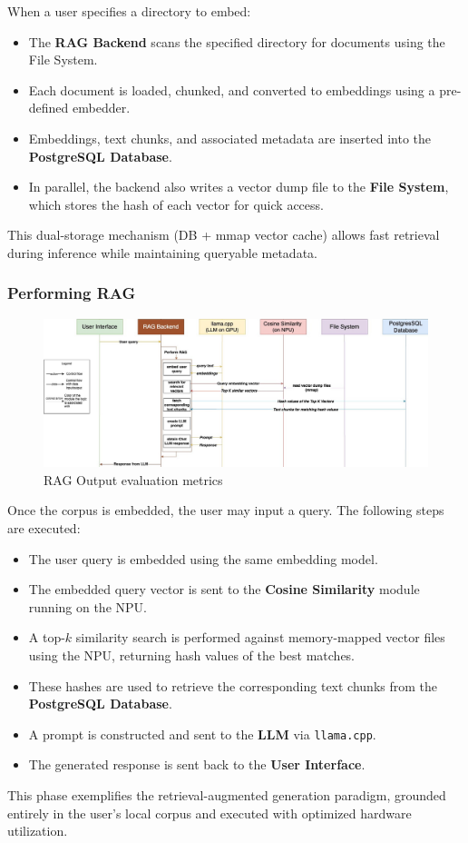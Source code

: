 When a user specifies a directory to embed:

\begin{itemize}
    \item The \textbf{RAG Backend} scans the specified directory for documents using the File System.
    \item Each document is loaded, chunked, and converted to embeddings using a pre-defined embedder.
    \item Embeddings, text chunks, and associated metadata are inserted into the \textbf{PostgreSQL Database}.
    \item In parallel, the backend also writes a vector dump file to the \textbf{File System}, which stores the hash of each vector for quick access.
\end{itemize}

This dual-storage mechanism (DB + mmap vector cache) allows fast retrieval during inference while maintaining queryable metadata.


\subsubsection{Performing RAG}
\label{subsec:AppDesignWorkflow-PerformingRAG}


\begin{figure}[H]
    \centering
    \includegraphics[width=1.0\linewidth]{images/tldr-app-worklfow-pt3.jpg}
    \caption{RAG Output evaluation metrics ~\cite{cardenas2023rag}}
    \label{fig:autoregressive_decoding}
\end{figure}

Once the corpus is embedded, the user may input a query. The following steps are executed:

\begin{itemize}
    \item The user query is embedded using the same embedding model.
    \item The embedded query vector is sent to the \textbf{Cosine Similarity} module running on the NPU.
    \item A top-$k$ similarity search is performed against memory-mapped vector files using the NPU, returning hash values of the best matches.
    \item These hashes are used to retrieve the corresponding text chunks from the \textbf{PostgreSQL Database}.
    \item A prompt is constructed and sent to the \textbf{LLM} via \texttt{llama.cpp}.
    \item The generated response is sent back to the \textbf{User Interface}.
\end{itemize}

This phase exemplifies the retrieval-augmented generation paradigm, grounded entirely in the user’s local corpus and executed with optimized hardware utilization.

